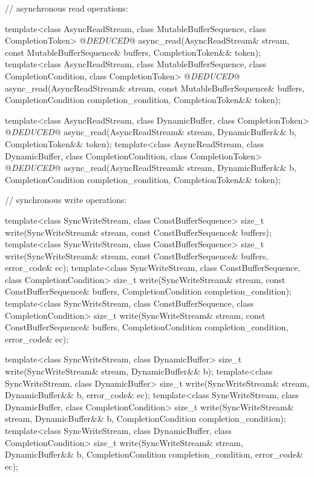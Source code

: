 \begin{codeblock}
{{{{  // asynchronous read operations:

  template<class AsyncReadStream, class MutableBufferSequence,
    class CompletionToken>
      @\textit{DEDUCED}@ async_read(AsyncReadStream& stream,
                      const MutableBufferSequence& buffers,
                      CompletionToken&& token);
  template<class AsyncReadStream, class MutableBufferSequence,
    class CompletionCondition, class CompletionToken>
      @\textit{DEDUCED}@ async_read(AsyncReadStream& stream,
                      const MutableBufferSequence& buffers,
                      CompletionCondition completion_condition,
                      CompletionToken&& token);

  template<class AsyncReadStream, class DynamicBuffer, class CompletionToken>
    @\textit{DEDUCED}@ async_read(AsyncReadStream& stream,
                    DynamicBuffer&& b, CompletionToken&& token);
  template<class AsyncReadStream, class DynamicBuffer,
    class CompletionCondition, class CompletionToken>
      @\textit{DEDUCED}@ async_read(AsyncReadStream& stream,
                      DynamicBuffer&& b,
                      CompletionCondition completion_condition,
                      CompletionToken&& token);

  // synchronous write operations:

  template<class SyncWriteStream, class ConstBufferSequence>
    size_t write(SyncWriteStream& stream,
                 const ConstBufferSequence& buffers);
  template<class SyncWriteStream, class ConstBufferSequence>
    size_t write(SyncWriteStream& stream,
                 const ConstBufferSequence& buffers, error_code& ec);
  template<class SyncWriteStream, class ConstBufferSequence,
    class CompletionCondition>
      size_t write(SyncWriteStream& stream,
                   const ConstBufferSequence& buffers,
                   CompletionCondition completion_condition);
  template<class SyncWriteStream, class ConstBufferSequence,
    class CompletionCondition>
      size_t write(SyncWriteStream& stream,
                   const ConstBufferSequence& buffers,
                   CompletionCondition completion_condition,
                   error_code& ec);

  template<class SyncWriteStream, class DynamicBuffer>
    size_t write(SyncWriteStream& stream, DynamicBuffer&& b);
  template<class SyncWriteStream, class DynamicBuffer>
    size_t write(SyncWriteStream& stream, DynamicBuffer&& b, error_code& ec);
  template<class SyncWriteStream, class DynamicBuffer, class CompletionCondition>
    size_t write(SyncWriteStream& stream, DynamicBuffer&& b,
                 CompletionCondition completion_condition);
  template<class SyncWriteStream, class DynamicBuffer, class CompletionCondition>
    size_t write(SyncWriteStream& stream, DynamicBuffer&& b,
                 CompletionCondition completion_condition, error_code& ec);

}}}}
\end{codeblock}
